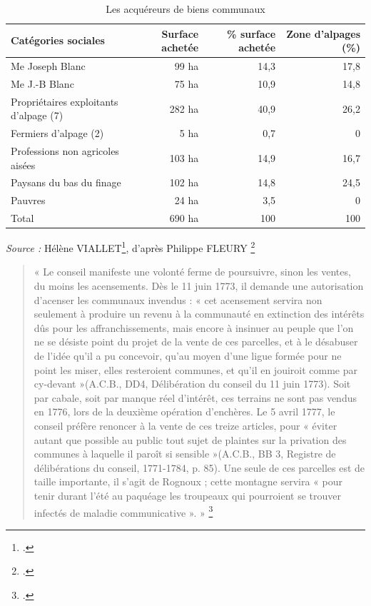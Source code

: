 \documentclass[12pt,a4paper]{report}
\begin{document}
\begin{table}[htbp]
	\centering
	\caption{Les acquéreurs de biens communaux}
	\label{tab:acquereurs_communaux}
	\begin{tabular}{lrrr}
		\toprule
		Catégories sociales & Surface achetée & \% surface achetée & Zone d’alpages (\%) \\
		\midrule
		Me Joseph Blanc & 99 ha & 14,3 & 17,8 \\
		Me J.-B Blanc & 75 ha & 10,9 & 14,8 \\
		Propriétaires exploitants d’alpage (7) & 282 ha & 40,9 & 26,2 \\
		Fermiers d’alpage (2) & 5 ha & 0,7 & 0 \\
		Professions non agricoles aisées & 103 ha & 14,9 & 16,7 \\
		Paysans du bas du finage & 102 ha & 14,8 & 24,5 \\
		Pauvres & 24 ha & 3,5 & 0 \\
		\midrule
		Total & 690 ha & 100 & 100 \\
		\bottomrule
	\end{tabular}
	
	\footnotesize
\end{table}
\emph{Source :} Hélène VIALLET\footcite[80]{HViallet1993}, d’après Philippe FLEURY \footcite[40]{Fleury1985CommunalBeaufort}


\begin{quote}
	« Le conseil manifeste une volonté ferme de poursuivre, sinon les ventes, du moins les acensements. Dès le 11 juin 1773, il demande une autorisation d'acenser les communaux invendus : « cet acensement servira non seulement à produire un revenu à la communauté en extinction des intérêts dûs pour les affranchissements, mais encore à insinuer au peuple que l'on ne se désiste point du projet de la vente de ces parcelles, et à le désabuser de l'idée qu'il a pu concevoir, qu'au moyen d'une ligue formée pour ne point les miser, elles resteroient communes, et qu'il en jouiroit comme par cy-devant »(A.C.B., DD4, Délibération du conseil du 11 juin 1773). Soit par cabale, soit par manque réel d'intérêt, ces terrains ne sont pas vendus en 1776, lors de la deuxième opération d'enchères. Le 5 avril 1777, le conseil préfère renoncer à la vente de ces treize articles, pour « éviter autant que possible au public tout sujet de plaintes sur la privation des communes à laquelle il paroît si sensible »(A.C.B., BB 3, Registre de délibérations du conseil, 1771-1784, p. 85). Une seule de ces parcelles est de taille importante, il s'agit de Rognoux ; cette montagne servira « pour tenir durant l'été au paquéage les troupeaux qui pourroient se trouver infectés de maladie communicative ». »
	\footcite[81]{HViallet1993}
\end{quote}
\end{document}
